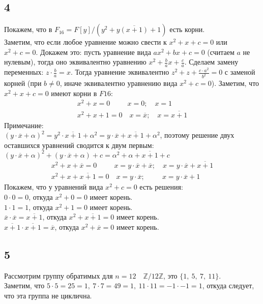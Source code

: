 		\subsection{4}
		Покажем, что в $F_{16} = F[y]/(y^2 + y\overline{(x+1)} + 1)$ есть корни.\\
		Заметим, что если любое уравнение можно свести к $x^2 + x + c = 0$ или $x^2 + c = 0$. Докажем это: пусть уравнение вида $ax^2 + bx + c = 0$ (считаем $a$ не нулевым), тогда оно эквивалентно уравнению $x^2 + \frac{b}{a}x + \frac{c}{a}$. Сделаем замену переменных: $z \cdot \frac{b}{a} = x$. Тогда уравнение эквивалентно $z^2 + z + \frac{c \cdot a^2}{b^2} = 0$ с заменой корней (при $b \ne 0$, иначе эквивалентно уравнению вида $x^2 + c = 0$). Заметим, что $x^2 + x + c = 0$ имеют корни в $F16$: \\
		\begin{gather*}
			x^2 + x = 0 \qquad \ \ x = 0; \quad x = 1 \\
			x^2 + x + 1 = 0 \quad x = \overline{x}; \quad x = \overline{x+1}
		\end{gather*}
		Примечание: \\$(y \cdot \overline{x} + \alpha)^2 = y^2 \cdot \overline{x+1} + \alpha^2 = y \cdot \overline{x} + \overline{x+1} + \alpha^2$, поэтому решение двух оставшихся уравнений сводится к двум первым: $(y \cdot \overline{x} + \alpha)^2 + (y \cdot \overline{x} + \alpha) + c = \alpha^2 + \alpha + \overline{x+1} + c$\\
		\begin{gather*}
		x^2 + x + \overline{x} = 0 \qquad \ \ x = y \cdot \overline{x} + \overline{x}; \quad x = y \cdot \overline{x} + \overline{x+1} \\
		x^2 + x + \overline{x+1} = 0 \quad x = y \cdot \overline{x}; \qquad \ \ x = y \cdot \overline{x} + 1 
		\end{gather*}
		Покажем, что у уравнений вида $x^2 + c = 0$ есть решения: \\
		$0 \cdot 0 = 0$, откуда $x^2 + 0 = 0$ имеет корень. \\
		$1 \cdot 1 = 1$, откуда $x^2 + 1 = 0$ имеет корень. \\
		$\overline{x} \cdot \overline{x} = \overline{x+1}$, откуда $x^2 + \overline{x+1} = 0$ имеет корень. \\
		$\overline{x+1} \cdot \overline{x+1} = \overline{x}$, откуда $x^2 + \overline{x} = 0$ имеет корень. 
		
		
		\subsection{5}
		Рассмотрим группу обратимых для $n = 12 \quad \mathbb{Z}/ 12 \mathbb{Z}$, это $\{ 1,\ 5,\ 7,\ 11 \}$.\\
		Заметим, что $5 \cdot 5 = 25 = 1,\ 7 \cdot 7 = 49 = 1,\ 11 \cdot 11 = -1 \cdot -1 = 1$, откуда следует, что эта группа не циклична.
		

